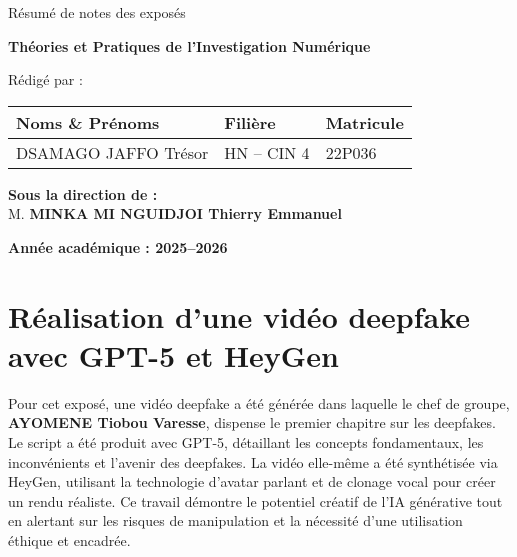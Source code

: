 \documentclass[12pt, a4paper]{article}
\begin{document}
\begin{titlepage}

	\vspace{1cm}

	{\Large Résumé de notes des exposés}

	\vspace{0.5cm}

	{\LARGE \textbf{Théories et Pratiques de l'Investigation Numérique}}

	\vspace{2cm}

	{\large Rédigé par :}

	\vspace{0.5cm}

	\begin{tabular}{|>{\centering\arraybackslash}m{8cm}
		|>{\centering\arraybackslash}m{4cm}
		|>{\centering\arraybackslash}m{3cm}|}
		\hline
		\textbf{Noms \& Prénoms} & \textbf{Filière} & \textbf{Matricule} \\
		\hline
		DSAMAGO JAFFO Trésor     & HN -- CIN 4      & 22P036             \\
		\hline
	\end{tabular}

	\vfill

	\begin{Large}
		\textbf{Sous la direction de :} \\
		M. \textbf{MINKA MI NGUIDJOI Thierry Emmanuel} \\
	\end{Large}

	\vspace{1cm}

	\textbf{Année académique : 2025--2026}
\end{titlepage}

\section{Réalisation d'une vidéo deepfake avec GPT-5 et HeyGen}

Pour cet exposé, une vidéo deepfake a été générée dans laquelle le chef de groupe, \textbf{AYOMENE Tiobou Varesse}, dispense le premier chapitre sur les deepfakes. Le script a été produit avec GPT-5, détaillant les concepts fondamentaux, les inconvénients et l'avenir des deepfakes. La vidéo elle-même a été synthétisée via HeyGen, utilisant la technologie d'avatar parlant et de clonage vocal pour créer un rendu réaliste. Ce travail démontre le potentiel créatif de l'IA générative tout en alertant sur les risques de manipulation et la nécessité d'une utilisation éthique et encadrée.
\end{document}
